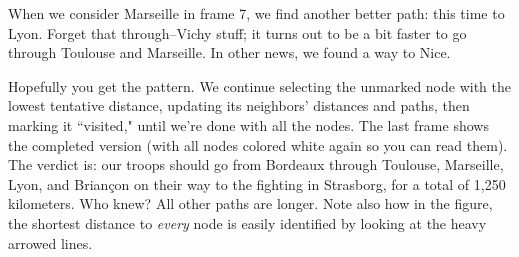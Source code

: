 When we consider Marseille in frame 7, we find another better path: this
time to Lyon. Forget that through--Vichy stuff; it turns out to be a bit
faster to go through Toulouse and Marseille. In other news, we found a way
to Nice.

Hopefully you get the pattern. We continue selecting the unmarked node with
the lowest tentative distance, updating its neighbors' distances and paths,
then marking it ``visited," until we're done with all the nodes. The last
frame shows the completed version (with all nodes colored white again so
you can read them). The verdict is: our troops should go from Bordeaux
through Toulouse, Marseille, Lyon, and Brian\c{c}on on their way to the
fighting in Strasborg, for a total of 1,250 kilometers. Who knew? All other
paths are longer. Note also how in the figure, the shortest distance to
\textit{every} node is easily identified by looking at the heavy arrowed
lines.


